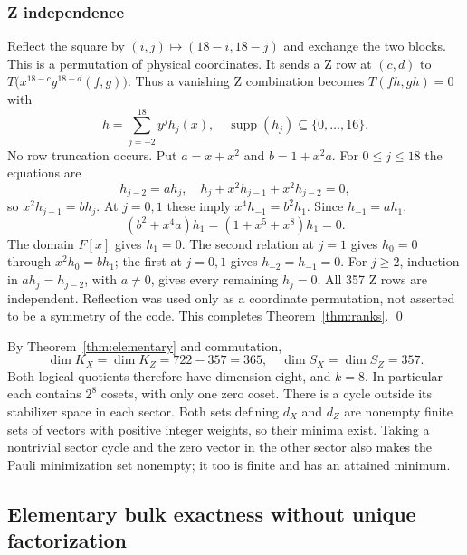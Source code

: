 \documentclass{article}
\DeclareMathOperator{\supp}{supp}
\begin{document}
\subsubsection{Z independence}\label{app:z-independence}

Reflect the square by \((i,j) \mapsto (18 - i, 18 - j)\) and exchange the two
blocks. This is a permutation of physical coordinates. It sends a Z
row at \((c,d)\) to \(T\bigl(x^{18-c} y^{18-d} (f, g)\bigr)\).
Thus a vanishing Z combination becomes \(T(fh, gh) = 0\) with
\begin{equation}
  h = \sum_{j=-2}^{18} y^j h_j(x), \quad \supp(h_j) \subseteq \{0, \dots, 16\}.
\end{equation}
No row truncation occurs. Put \(a = x + x^2\) and \(b = 1 + x^2 a\).
For \(0 \le j \le 18\) the equations are
\begin{equation}
  h_{j-2} = a h_j, \quad
  h_j + x^2 h_{j-1} + x^2 h_{j-2} = 0,
\end{equation}
so \(x^2 h_{j-1} = b h_j\).
At \(j = 0, 1\) these imply \(x^4 h_{-1} = b^2 h_1\).
Since \(h_{-1} = a h_1\),
\begin{equation}
  (b^2 + x^4 a) h_1 = (1 + x^5 + x^8) h_1 = 0.
\end{equation}
The domain \(F[x]\) gives \(h_1 = 0\). The second relation at \(j = 1\) gives
\(h_0 = 0\) through \(x^2 h_0 = b h_1\); the first at \(j = 0, 1\) gives
\(h_{-2} = h_{-1} = 0\).
For \(j \ge 2\), induction in \(a h_j = h_{j-2}\), with \(a \ne 0\), gives
every remaining \(h_j = 0\). All 357 Z rows are independent.
Reflection was used only as a coordinate permutation, not asserted to be
a symmetry of the code. This completes Theorem~\ref{thm:ranks}. \qed

By Theorem~\ref{thm:elementary} and commutation,
\begin{equation}
  \dim K_X = \dim K_Z = 722 - 357 = 365,
  \quad \dim S_X = \dim S_Z = 357.
\end{equation}
Both logical quotients therefore have dimension eight, and \(k = 8\).
In particular each contains \(2^8\) cosets, with only one zero coset.
There is a cycle outside its stabilizer space in each sector. Both sets
defining \(d_X\) and \(d_Z\) are nonempty finite sets of vectors with positive
integer weights, so their minima exist. Taking a nontrivial sector cycle
and the zero vector in the other sector also makes the Pauli minimization
set nonempty; it too is finite and has an attained minimum.

\subsection{Elementary bulk exactness without unique factorization}\label{app:bulk}
\end{document}
